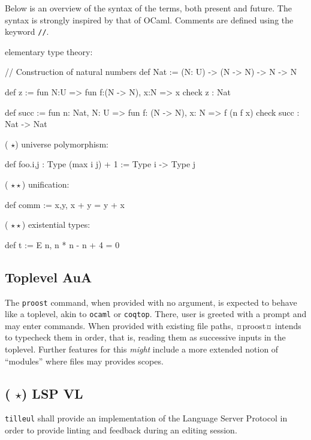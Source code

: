 \documentclass[twocolumn]{article}
\newcommand{\members}[1]{\texorpdfstring{\hfill\scriptsize #1}{}}
\newcommand{\etun}{({\color{Green} $\star$}) }
\newcommand{\etde}{({\color{Orange} $\star\star$}) }
\begin{document}
Below is an overview of the syntax of the terms, both present and future. The syntax is strongly inspired by that of OCaml. Comments are defined using the keyword \texttt{//}.

\vspace{1.5mm}
elementary type theory:
\begin{proost}
// Construction of natural numbers
def Nat :=
(N: U) -> (N -> N) -> N -> N

def z :=
fun N:U => fun f:(N -> N), x:N => x
check z : Nat

def succ := fun n: Nat, N: U =>
fun f: (N -> N), x: N => f (n f x)
check succ : Nat -> Nat
\end{proost}

\etun universe polymorphism:
\begin{proost}
def foo.{i,j} : Type (max i j) + 1
:= Type i -> Type j
\end{proost}

\etde unification:
\begin{proost}
def comm := \/ x,y, x + y = y + x
\end{proost}

\etde existential types:
\begin{proost}
def t := E n, n * n - n + 4 = 0
\end{proost}


\subsection{Toplevel  \members{AuA}}
The \texttt{proost} command, when provided with no argument, is expected to behave like a toplevel, akin to \texttt{ocaml} or \texttt{coqtop}. There, user is greeted with a prompt and may enter commands. When provided with existing file paths, ¤proost¤ intends to typecheck them in
order, that is, reading them as successive inputs in the toplevel. Further features for this \emph{might} include a more extended notion of ``modules'' where files may provides scopes.
{
  \begin{center}
  \end{center}
}


\subsection{\etun LSP \members{VL}}
\texttt{tilleul} shall provide an implementation of the Language Server Protocol in order to provide linting and feedback during an editing session.
\end{document}
